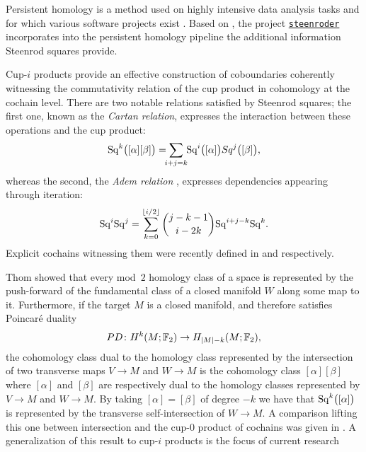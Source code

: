 \begin{remark*}
	Persistent homology is a method used on highly intensive data analysis tasks \cite{carlsson2008images, chan2013viral, lee2017quantifying} and for which various software projects exist \cite{bauer2021ripser, gudhi, medina2021giotto}.
	Based on \cite{medina2021per_st}, the project \href{https://github.com/Steenroder/steenroder}{\texttt{steenroder}} incorporates into the persistent homology pipeline the additional information Steenrod squares provide.
\end{remark*}

\begin{remark*}[Relations]
	Cup-$i$ products provide an effective construction of coboundaries coherently witnessing the commutativity relation of the cup product in cohomology at the cochain level.
	There are two notable relations satisfied by Steenrod squares;
	the first one, known as the \textit{Cartan relation}, expresses the interaction between these operations and the cup product:
	\begin{equation*}
	\Sq^k \big( [\alpha] [\beta] \big) =
	\sum_{\mathclap{i+j=k}} \, \Sq^i\big([\alpha]\big) Sq^j\big([\beta]\big),
	\end{equation*}
	whereas the second, the \textit{Adem relation} \cite{adem1952iteration}, expresses dependencies appearing through iteration:
	\begin{equation*}
	\mathrm{Sq}^i \mathrm{Sq}^j =
	\sum_{k=0}^{\lfloor i/2 \rfloor} \binom{j-k-1}{i-2k} \mathrm{Sq}^{i+j-k} \mathrm{Sq}^k.
	\end{equation*}
	Explicit cochains witnessing them were recently defined in \cite{medina2020cartan} and \cite{medina2021adem} respectively.
\end{remark*}

\begin{remark*}
	Thom showed that every mod~$2$ homology class of a space is represented by the push-forward of the fundamental class of a closed manifold $W$ along some map to it.
	Furthermore, if the target $M$ is a closed manifold, and therefore satisfies Poincar\'{e} duality
	\[
	PD \colon H^k(M ;{\mathbb{F}_2}) \to H_{\lvert M\rvert-k}(M; {\mathbb{F}_2}),
	\]
	the cohomology class dual to the homology class represented by the intersection of two transverse maps $V \to M$ and $W \to M$ is the cohomology class $[\alpha] [\beta]$ where $[\alpha]$ and $[\beta]$ are respectively dual to the homology classes represented by $V \to M$ and $W \to M$.
	By taking $[\alpha] = [\beta]$ of degree $-k$ we have that $\mathrm{Sq}^k \big( [\alpha] \big)$ is represented by the transverse self-intersection of $W \to M$.
	A comparison lifting this one between intersection and the cup-$0$ product of cochains was given in \cite{medina2021flowing}.
	A generalization of this result to \mbox{cup-$i$} products is the focus of current research \cite{medina2022foundations}
\end{remark*}